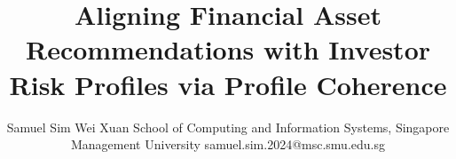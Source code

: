 \title{Aligning Financial Asset Recommendations with Investor Risk Profiles via Profile Coherence}

\author{
    Samuel Sim Wei Xuan
    \affiliations
    School of Computing and Information Systems, Singapore Management University
    \emails
    samuel.sim.2024@msc.smu.edu.sg
}
